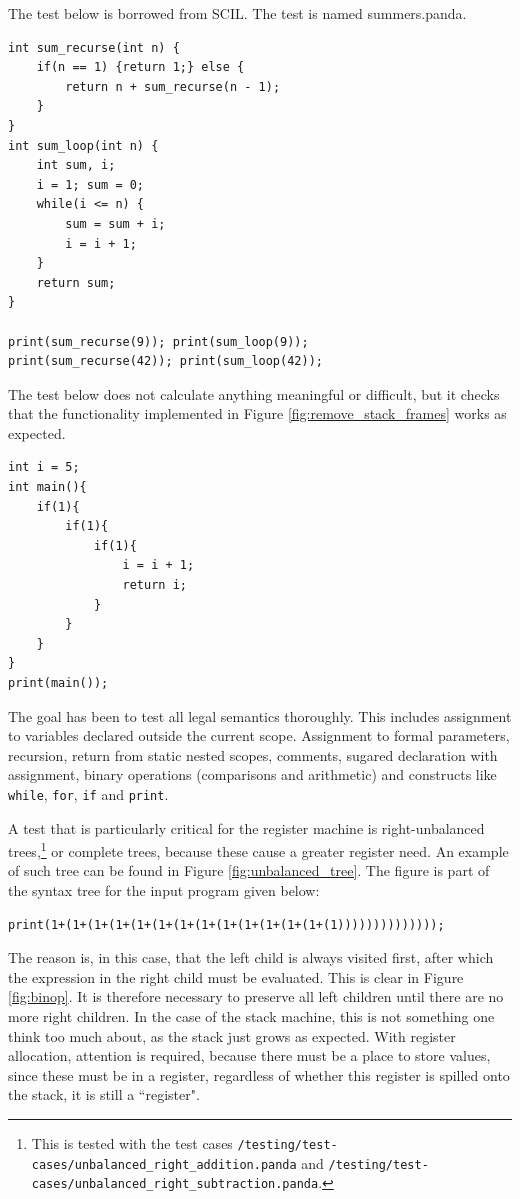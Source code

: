 The test below is borrowed from SCIL. The test is named summers.panda.

\begin{verbatim}
int sum_recurse(int n) {
    if(n == 1) {return 1;} else {
        return n + sum_recurse(n - 1);
    }
}
int sum_loop(int n) {
    int sum, i;
    i = 1; sum = 0;
    while(i <= n) {
        sum = sum + i;
        i = i + 1;
    }
    return sum;
}

print(sum_recurse(9)); print(sum_loop(9));
print(sum_recurse(42)); print(sum_loop(42));
\end{verbatim}

The test below does not calculate anything meaningful or difficult, but it checks that the functionality implemented in Figure \ref{fig:remove_stack_frames} works as expected.

\begin{verbatim}
int i = 5;
int main(){
    if(1){
        if(1){
            if(1){
                i = i + 1;
                return i;
            }
        }
    }
}
print(main());
\end{verbatim}

The goal has been to test all legal semantics thoroughly. This includes assignment to variables declared outside the current scope. Assignment to formal parameters, recursion, return from static nested scopes, comments, sugared declaration with assignment, binary operations (comparisons and arithmetic) and constructs like \texttt{while}, \texttt{for}, \texttt{if} and \texttt{print}.

A test that is particularly critical for the register machine is right-unbalanced trees,\footnote{This is tested with the test cases \texttt{/testing/test-cases/unbalanced\_right\_addition.panda} and \texttt{/testing/test-cases/unbalanced\_right\_subtraction.panda}.} or complete trees, because these cause a greater register need. An example of such tree can be found in Figure \ref{fig:unbalanced_tree}. The figure is part of the syntax tree for the input program given below:

\begin{verbatim}
print(1+(1+(1+(1+(1+(1+(1+(1+(1+(1+(1+(1+(1+(1))))))))))))));
\end{verbatim}

The reason is, in this case, that the left child is always visited first, after which the expression in the right child must be evaluated. This is clear in Figure \ref{fig:binop}. It is therefore necessary to preserve all left children until there are no more right children. In the case of the stack machine, this is not something one think too much about, as the stack just grows as expected. With register allocation, attention is required, because there must be a place to store values, since these must be in a register, regardless of whether this register is spilled onto the stack, it is still a ``register".

